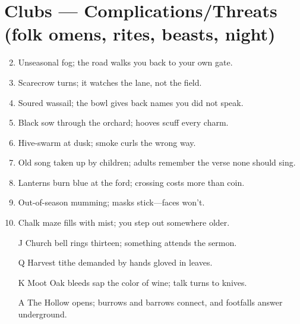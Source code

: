 \section*{Clubs --- Complications/Threats (folk omens, rites, beasts, night)}
\begin{enumerate}
\setcounter{enumi}{1}
\item Unseasonal fog; the road walks you back to your own gate.
\item Scarecrow turns; it watches the lane, not the field.
\item Soured wassail; the bowl gives back names you did not speak.
\item Black sow through the orchard; hooves scuff every charm.
\item Hive-swarm at dusk; smoke curls the wrong way.
\item Old song taken up by children; adults remember the verse none should sing.
\item Lanterns burn blue at the ford; crossing costs more than coin.
\item Out-of-season mumming; masks stick---faces won't.
\item Chalk maze fills with mist; you step out somewhere older.
\item[J] Church bell rings thirteen; something attends the sermon.
\item[Q] Harvest tithe demanded by hands gloved in leaves.
\item[K] Moot Oak bleeds sap the color of wine; talk turns to knives.
\item[A] The Hollow opens; burrows and barrows connect, and footfalls answer underground.
\end{enumerate}

